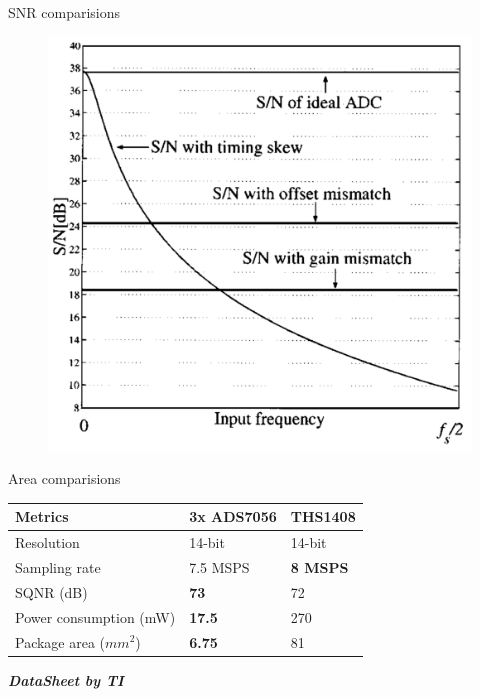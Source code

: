\documentclass{beamer}
\begin{document}
\begin{frame}{SNR comparisions}
\begin{figure}
	\includegraphics[scale=0.25]{./figs/Over.png}
\end{figure}
\end{frame}

\begin{frame}{Area comparisions}
	\begin{table}[]
\begin{tabular}{|l|l|l|}
\hline
      Metrics                 & 3x ADS7056 & THS1408 \\
                       \hline
                       \hline
Resolution             & 14-bit     & 14-bit  \\
\hline
Sampling rate          & 7.5 MSPS   & \textbf{8 MSPS}  \\
\hline
SQNR (dB)              & \textbf{73}         & 72      \\
\hline
Power consumption (mW) & \textbf{17.5}       & 270    \\
\hline
Package	area ($mm^2$) & \textbf{6.75} & 81\\
\hline
\end{tabular}
\end{table}
\textit{
\textbf{DataSheet by TI}}
\end{frame}
\end{document}
